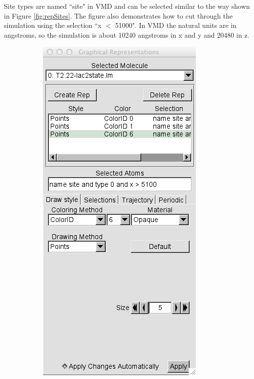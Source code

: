 Site types are named ``site" in VMD and can be selected similar to the way shown in Figure \ref{fig:repSites}.  The figure also demonstrates how to cut through the simulation using the selection ``x $<$ 51000".  In VMD the natural units are in angstroms, so the simulation is about 10240 angstroms  in x and y and 20480 in z.\\

\begin{figure}[h!]
  \centering
        \begin{subfigure}[b]{0.3\textwidth}
          \includegraphics[width=\textwidth]{Figures/RepSites.png}

\end{subfigure}
\end{figure}
